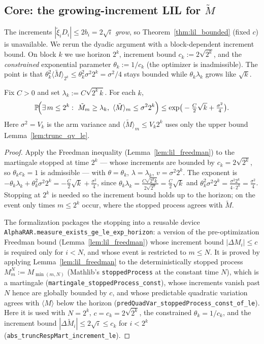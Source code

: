 \subsection{Core: the growing-increment LIL for $\tilde M$}
\label{sec:pre_lil_grow}

The increments $|\tilde\xi_i D_i|\le 2b_i=2\sqrt i$ \emph{grow}, so Theorem~\ref{thm:lil_bounded}
(fixed $c$) is unavailable. We rerun the dyadic argument with a block-dependent increment bound.
On block $k$ we use horizon $2^k$, increment bound $c_k:=2\sqrt{2^k}$, and the \emph{constrained}
exponential parameter $\theta_k:=1/c_k$ (the optimizer is inadmissible). The point is that
$\theta_k^2\langle\tilde M\rangle_{2^k}\le\theta_k^2\sigma^2 2^k=\sigma^2/4$ stays bounded while
$\theta_k\lambda_k$ grows like $\sqrt k$.

\begin{lemma}\label{lem:trunc_block}
Fix $C>0$ and set $\lambda_k:=C\sqrt{2^k\,k}$. For each $k$,
\[
  \mathbb{P}\!\Big(\exists\,m\le 2^k:\ \tilde M_m\ge\lambda_k,\ \langle\tilde M\rangle_m\le\sigma^2 2^k\Big)
  \le \exp\!\big(-\tfrac{C}{2}\sqrt k+\tfrac{\sigma^2}{4}\big).
\]
Here $\sigma^2=V_k$ is the arm variance and $\langle\tilde M\rangle_m\le V_k 2^k$ uses only the
upper bound Lemma~\ref{lem:trunc_qv_le}.
\end{lemma}
\begin{proof}
Apply the Freedman inequality (Lemma~\ref{lem:lil_freedman}) to the martingale stopped at time
$2^k$ --- whose increments are bounded by $c_k=2\sqrt{2^k}$, so $\theta_k c_k=1$ is admissible ---
with $\theta=\theta_k$, $\lambda=\lambda_k$, $v=\sigma^2 2^k$. The exponent is
$-\theta_k\lambda_k+\theta_k^2\sigma^2 2^k=-\tfrac C2\sqrt k+\tfrac{\sigma^2}4$, since
$\theta_k\lambda_k=\tfrac{C\sqrt{2^k k}}{2\sqrt{2^k}}=\tfrac C2\sqrt k$ and
$\theta_k^2\sigma^2 2^k=\tfrac{\sigma^2 2^k}{4\cdot2^k}=\tfrac{\sigma^2}4$. Stopping at $2^k$ is
needed so the increment bound holds up to the horizon; on the event only times $m\le 2^k$ occur,
where the stopped process agrees with $\tilde M$.

The formalization packages the stopping into a reusable device
\texttt{AlphaRAR.measure\_exists\_ge\_le\_exp\_horizon}: a version of the pre-optimization Freedman
bound (Lemma~\ref{lem:lil_freedman}) whose increment bound $|\Delta M_i|\le c$ is required only for
$i<N$, and whose event is restricted to $m\le N$. It is proved by applying
Lemma~\ref{lem:lil_freedman} to the deterministically stopped process
$M^N_m:=M_{\min(m,N)}$ (Mathlib's \texttt{stoppedProcess} at the constant time $N$), which is a martingale
(\texttt{martingale\_stoppedProcess\_const}), whose increments vanish past $N$ hence are globally bounded by
$c$, and whose predictable quadratic variation agrees with $\langle M\rangle$ below the horizon
(\texttt{predQuadVar\_stoppedProcess\_const\_of\_le}). Here it is used with $N=2^k$, $c=c_k=2\sqrt{2^k}$, the
constrained $\theta_k=1/c_k$, and the increment bound $|\Delta\tilde M_i|\le2\sqrt i\le c_k$ for
$i<2^k$ (\texttt{abs\_truncRespMart\_increment\_le}).
\end{proof}

